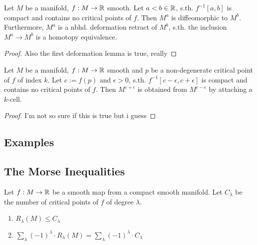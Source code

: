 \documentclass[a4paper,11pt]{article}
\begin{document}
\begin{theorem}
   \label{theorem:1st deformation lemma}
   Let $M$ be a manifold, $f: M \rightarrow {\mathbb R}$ smooth. Let $a < b \in {\mathbb R}$, s.th. 
   $f^{-1}[a, b]$ is compact and contains no critical points of $f$. Then $M^a$ is diffeomorphic
   to $M^b$. \\ 
   Furthermore, $M^a$ is a nbhd. deformation retract of $M^b$, s.th. the inclusion
   $M^a \rightarrow M^b$ is a homotopy equivalence.
\end{theorem}

\begin{proof}
   Also the first deformation lemma is true, really
\end{proof}

\begin{theorem}
   \label{theorem:2nd deformation lemma}
   Let $M$ be a manifold, $f: M \rightarrow {\mathbb R}$ smooth and $p$ be a non-degenerate critical point
   of $f$ of index $k$. Let $c := f(p)$ and $\epsilon > 0$, s.th. $f^{-1}[c-\epsilon, c+\epsilon]$
   is compact and contains no critical points of $f$. Then $M^{c+\epsilon}$ is obtained from $M^{c-\epsilon}$
   by attaching a $k$-cell.
\end{theorem}

\begin{proof}
   I'm not so sure if this is true but i guess
\end{proof}

\subsection{Examples}

\subsection{The Morse Inequalities}

\begin{lemma}
   \label{lemma:weak morse inequalities}
   Let $f: M \rightarrow {\mathbb R}$ be a smooth map from a compact smooth manifold. Let $C_{\lambda}$
   be the number of critical points of $f$ of degree $\lambda$.
   \begin{enumerate}
      \item $R_{\lambda} (M) \leq C_{\lambda}$
      \item $\sum_{\lambda} (-1)^{\lambda} \cdot R_{\lambda}(M) = \sum_{\lambda} (-1)^{\lambda} \cdot C_{\lambda} $
   \end{enumerate}
\end{lemma}
\end{document}
